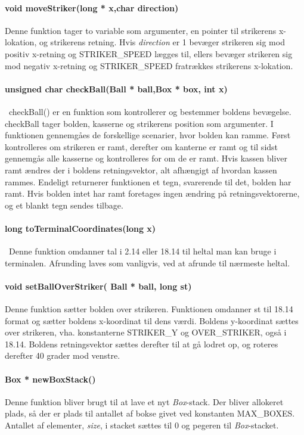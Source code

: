 \paragraph{void moveStriker(long * x,char direction)}
Denne funktion tager to variable som argumenter, en pointer til strikerens x-lokation, og  strikerens retning. Hvis \textit{direction} er 1 bevæger strikeren sig mod positiv x-retning og STRIKER\_SPEED lægges til, ellers bevæger strikeren sig mod negativ x-retning og STRIKER\_SPEED fratrækkes strikerens x-lokation.
\paragraph{unsigned char checkBall(Ball * ball,Box * box,  int x)}\
checkBall() er en funktion som kontrollerer og bestemmer boldens bevægelse. checkBall tager bolden, kasserne og strikerens position som argumenter. I funktionen gennemgåes de forskellige scenarier, hvor bolden kan ramme. Først kontrolleres om strikeren er ramt, derefter om kanterne er ramt og til sidst gennemgås alle kasserne og kontrolleres for om de er ramt. Hvis kassen bliver ramt ændres der i boldens retningsvektor, alt afhængigt af hvordan kassen rammes. Endeligt returnerer funktionen et tegn, svarerende til det, bolden har ramt. Hvis bolden intet har ramt foretages ingen ændring på retningsvektorerne, og et blankt tegn sendes tilbage. 
\paragraph{long toTerminalCoordinates(long x)}\
Denne funktion omdanner tal i 2.14 eller 18.14 til heltal man kan bruge i terminalen. Afrunding laves som vanligvis, ved at afrunde til nærmeste heltal.

\paragraph{void setBallOverStriker( Ball * ball, long st)}
Denne funktion sætter bolden over strikeren.
Funktionen omdanner st til 18.14 format og sætter boldens x-koordinat til dens værdi.
Boldens y-koordinat sættes over strikeren, vha. konstanterne STRIKER\_Y og OVER\_STRIKER, også i 18.14. Boldens retningsvektor sættes derefter til at gå lodret op, og roteres derefter 40 grader mod venstre.
\paragraph{Box * newBoxStack()}
Denne funktion bliver brugt til at lave et nyt \textit{Box}-stack. Der bliver allokeret plads, så der er plads til antallet af bokse givet ved konstanten MAX\_BOXES. Antallet af elementer, \textit{size}, i stacket sættes til 0 og  pegeren til \textit{Box}-stacket.
